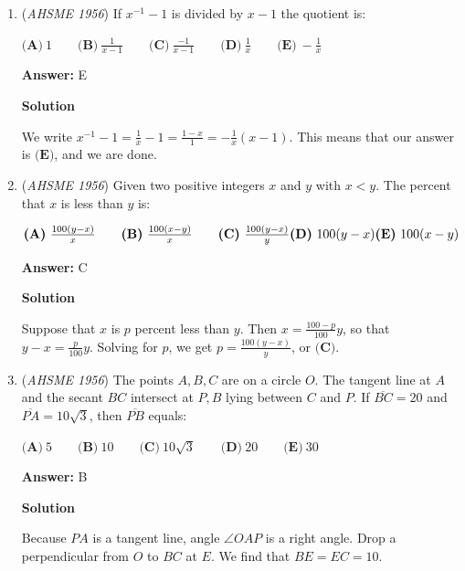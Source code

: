 \begin{enumerate}
 Therefore the entire expression is equal to $1 - \sqrt{3}$, so our answer is $\boxed{\textbf{A}}$ and we are done.

 


	\item (\textit{AHSME 1956}) If $x^{ - 1} - 1$ is divided by $x - 1$ the quotient is: 


 $\textbf{(A)}\ 1\qquad \textbf{(B)}\ \frac{1}{x-1}\qquad \textbf{(C)}\ \frac{-1}{x-1}\qquad \textbf{(D)}\ \frac{1}{x}\qquad \textbf{(E)}\ -\frac{1}{x}$

 \textbf{Answer: }E



\textbf{Solution}

We write $x^{-1} - 1 = \frac{1}{x} - 1 = \frac{1-x}{1} = -\frac{1}{x}(x - 1)$. This means that our answer is $\boxed{\textbf{(E)}}$, and we are done.

 


	\item (\textit{AHSME 1956}) Given two positive integers $x$ and $y$ with $x < y$. The percent that $x$ is less than $y$ is: 


 $\textbf{(A)}\ \frac{100(y-x)}{x}\qquad \textbf{(B)}\ \frac{100(x-y)}{x}\qquad \textbf{(C)}\ \frac{100(y-x)}{y}\qquad \\ \textbf{(D)}\ 100(y-x) \textbf{(E)}\ 100(x - y)$

 \textbf{Answer: }C



\textbf{Solution}

Suppose that $x$ is $p$ percent less than $y$. Then $x = \frac{100 - p}{100}y$, so that $y - x = \frac{p}{100}y$. Solving for $p$, we get $p = \frac{100(y-x)}{y}$, or $\boxed{\textbf{(C)}}$.

 


	\item (\textit{AHSME 1956}) The points $A,B,C$ are on a circle $O$. The tangent line at $A$ and the secant $BC$ intersect at $P, B$ lying between $C$ and $P$. 
If $\overline{BC} = 20$ and $\overline{PA} = 10\sqrt {3}$, then $\overline{PB}$ equals: 


 $\textbf{(A)}\ 5 \qquad\textbf{(B)}\ 10 \qquad\textbf{(C)}\ 10\sqrt {3} \qquad\textbf{(D)}\ 20 \qquad\textbf{(E)}\ 30$

 \textbf{Answer: }B



\textbf{Solution}

Because $PA$ is a tangent line, angle $\angle OAP$ is a right angle. Drop a perpendicular from $O$ to $BC$ at $E.$ We find that $BE = EC = 10.$ 


\end{enumerate}
